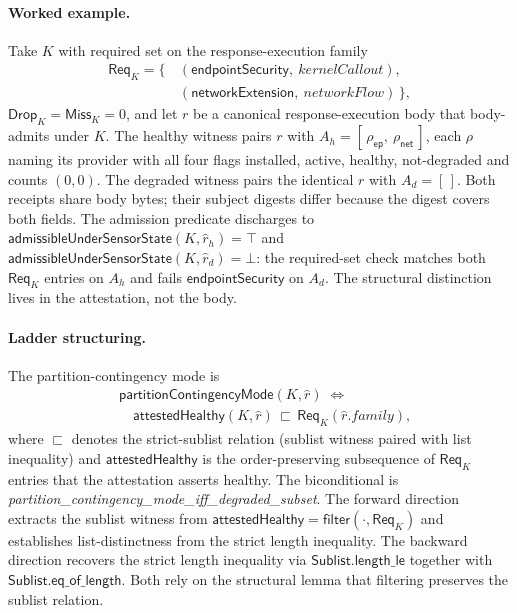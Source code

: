 \paragraph{Worked example.}
Take $K$ with required set on the response-execution family
\[
\begin{aligned}
  \mathsf{Req}_K = \{\,
    &(\mathsf{endpointSecurity},\ \mathit{kernelCallout}),\\
    &(\mathsf{networkExtension},\ \mathit{networkFlow})\,\},
\end{aligned}
\]
$\mathsf{Drop}_K = \mathsf{Miss}_K = 0$, and let $r$ be a canonical response-execution body that body-admits under $K$. The healthy witness pairs $r$ with $A_h = [\,\rho_{\mathsf{ep}},\ \rho_{\mathsf{net}}\,]$, each $\rho$ naming its provider with all four flags installed, active, healthy, not-degraded and counts $(0,0)$. The degraded witness pairs the identical $r$ with $A_d = [\,]$. Both receipts share body bytes; their subject digests differ because the digest covers both fields. The admission predicate discharges to $\mathsf{admissibleUnderSensorState}(K, \hat r_h) = \top$ and $\mathsf{admissibleUnderSensorState}(K, \hat r_d) = \bot$: the required-set check matches both $\mathsf{Req}_K$ entries on $A_h$ and fails $\mathsf{endpointSecurity}$ on $A_d$. The structural distinction lives in the attestation, not the body.

\paragraph{Ladder structuring.}
The partition-contingency mode is
\[
\begin{aligned}
  &\mathsf{partitionContingencyMode}(K, \hat r) \;\Leftrightarrow\; \\
  &\quad \mathsf{attestedHealthy}(K, \hat r) \,\sqsubset\, \mathsf{Req}_K(\hat r.\mathit{family}),
\end{aligned}
\]
where $\sqsubset$ denotes the strict-sublist relation (sublist witness paired with list inequality) and $\mathsf{attestedHealthy}$ is the order-preserving subsequence of $\mathsf{Req}_K$ entries that the attestation asserts healthy. The biconditional is \emph{partition\_\allowbreak contingency\_\allowbreak mode\_\allowbreak iff\_\allowbreak degraded\_\allowbreak subset}. The forward direction extracts the sublist witness from $\mathsf{attestedHealthy} = \mathsf{filter}(\cdot, \mathsf{Req}_K)$ and establishes list-distinctness from the strict length inequality. The backward direction recovers the strict length inequality via $\mathsf{Sublist.length\_le}$ together with $\mathsf{Sublist.eq\_of\_length}$. Both rely on the structural lemma that filtering preserves the sublist relation.

